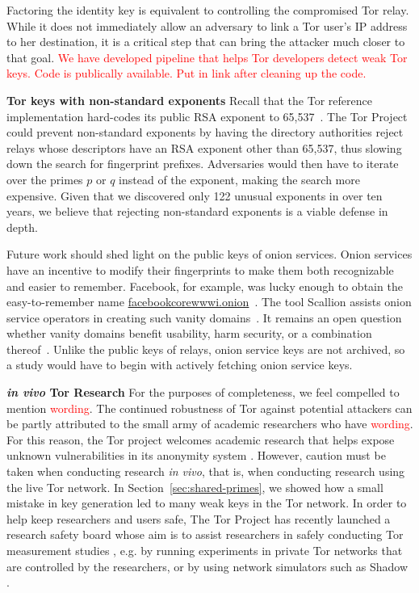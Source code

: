 Factoring the identity key is equivalent to controlling the compromised Tor relay. While it does not immediately allow an adversary to link a Tor user's IP address to her destination, it is a critical step that can bring the attacker much closer to that goal. \textcolor{red}{We have developed pipeline that helps Tor developers detect weak Tor keys. Code is publically available. Put in link after cleaning up the code.}

\textbf{Tor keys with non-standard exponents} Recall that the Tor reference implementation hard-codes its public RSA exponent
to 65,537~\cite[\S~0.3]{torspec}.  The Tor Project could prevent non-standard
exponents by having the directory authorities reject relays whose descriptors
have an RSA exponent other than 65,537, thus slowing down the search for
fingerprint prefixes.  Adversaries would then have to iterate over the primes
$p$ or $q$ instead of the exponent, making the search more expensive.  Given
that we discovered only 122 unusual exponents in over ten years, we believe that
rejecting non-standard exponents is a viable defense in depth.

Future work should shed light on the public keys of onion services.  Onion
services have an incentive to modify their fingerprints to make them both
recognizable and easier to remember.  Facebook, for example, was lucky enough to
obtain the easy-to-remember name \url{facebookcorewwwi.onion}~\cite{facebook}.
The tool Scallion assists onion service operators in creating such vanity
domains~\cite{scallion}.  It remains an open question whether vanity domains
benefit usability, harm security, or a combination
thereof~\cite{vanity-domains}.  Unlike the public keys of relays, onion service
keys are not archived, so a study would have to begin with actively fetching
onion service keys.

\textbf{\textit{in vivo} Tor Research} For the purposes of completeness, we feel compelled to mention \textcolor{red}{wording}. The continued robustness of Tor against potential attackers can be partly attributed to the small army of academic researchers who have \textcolor{red}{wording}. For this reason, the Tor project welcomes academic research that helps expose unknown vulnerabilities in its anonymity system \cite{torresearch}. However, caution must be taken when conducting research \textit{in vivo}, that is, when conducting research using the live Tor network. In Section~\ref{sec:shared-primes}, we showed how a small mistake in key generation led to many weak keys in the Tor network. In order to help keep researchers and users safe, The Tor Project has recently launched a research safety board whose aim is to assist researchers in safely conducting Tor measurement studies \cite{vanity-domains}, e.g. by running experiments in private Tor networks that are controlled by the researchers, or by using network simulators such as Shadow \cite{stem}.
